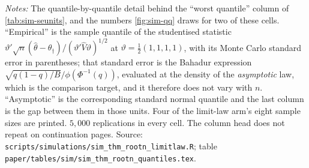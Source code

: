 \documentclass[
  12pt]{article}
\newcommand{\1}[1]{\mathds{1}\left[#1\right]}
\theoremstyle{plain}
\theoremstyle{definition}
\theoremstyle{definition}
\theoremstyle{remark}
\begin{document}
\begingroup
\footnotesize
{}
\label{tab:supp-quantiles}
\let\tabular\longtable
\let\endtabular\endlongtable

\addtocounter{table}{-1}
\endgroup
\begingroup\footnotesize
\textit{Notes:} The quantile-by-quantile detail behind the ``worst quantile''
column of \cref{tab:sim-seunits}, and the numbers \cref{fig:sim-qq} draws
for two of these cells. ``Empirical'' is the sample quantile of the studentised
statistic
$\vartheta'\sqrt n(\hat\theta-\theta_\dagger)/(\vartheta'\hat V\vartheta)^{1/2}$
at $\vartheta=\tfrac12(1,1,1,1)$, with its Monte Carlo standard error in
parentheses; that standard error is the Bahadur expression
$\sqrt{q(1-q)/B}/\phi(\Phi^{-1}(q))$, evaluated at the density of the
\emph{asymptotic} law, which is the comparison target, and it therefore does not
vary with $n$. ``Asymptotic'' is the corresponding standard normal quantile and
the last column is the gap between them in those units. Four of the limit-law
arm's eight sample sizes are printed. $5{,}000$ replications in every cell. The
column head does not repeat on continuation pages. Source:
\texttt{scripts/simulations/sim\_thm\_rootn\_limitlaw.R}; table
\texttt{paper/tables/sim/sim\_thm\_rootn\_quantiles.tex}.
\par\endgroup
\clearpage
\end{document}
